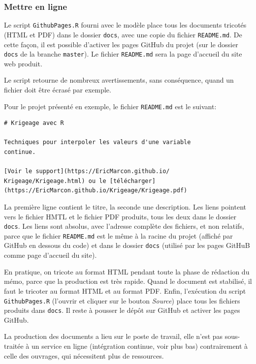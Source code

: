 \documentclass[
  11pt,
  french,
  a4paper,
  extrafontsizes,onecolumn,openright
  ]{memoir}
\begin{document}
\hypertarget{mettre-en-ligne}{%
\subsubsection{Mettre en ligne}\label{mettre-en-ligne}}

Le script \texttt{GithubPages.R} fourni avec le modèle place tous les documents tricotés (HTML et PDF) dans le dossier \texttt{docs}, avec une copie du fichier \texttt{README.md}.
De cette façon, il est possible d'activer les pages GitHub du projet (sur le dossier \texttt{docs} de la branche \texttt{master}).
Le fichier \texttt{README.md} sera la page d'accueil du site web produit.

Le script retourne de nombreux avertissements, sans conséquence, quand un fichier doit être écrasé par exemple.

Pour le projet présenté en exemple, le fichier \texttt{README.md} est le suivant:

\begin{verbatim}
# Krigeage avec R

Techniques pour interpoler les valeurs d'une variable
continue.

[Voir le support](https://EricMarcon.github.io/
Krigeage/Krigeage.html) ou le [télécharger]
(https://EricMarcon.github.io/Krigeage/Krigeage.pdf)
\end{verbatim}

La première ligne contient le titre, la seconde une description.
Les liens pointent vers le fichier HMTL et le fichier PDF produits, tous les deux dans le dossier \texttt{docs}.
Les liens sont absolus, avec l'adresse complète des fichiers, et non relatifs, parce que le fichier \texttt{README.md} est le même à la racine du projet (affiché par GitHub en dessous du code) et dans le dossier \texttt{docs} (utilisé par les pages GitHuB comme page d'accueil du site).

En pratique, on tricote au format HTML pendant toute la phase de rédaction du mémo, parce que la production est très rapide.
Quand le document est stabilisé, il faut le tricoter au format HTML et au format PDF.
Enfin, l'exécution du script \texttt{GithubPages.R} (l'ouvrir et cliquer sur le bouton \emph{Source}) place tous les fichiers produits dans \texttt{docs}.
Il reste à pousser le dépôt sur GitHub et activer les pages GitHub.

La production des documents a lieu sur le poste de travail, elle n'est pas sous-traitée à un service en ligne (intégration continue, voir plus bas) contrairement à celle des ouvrages, qui nécessitent plus de ressources.
\end{document}
